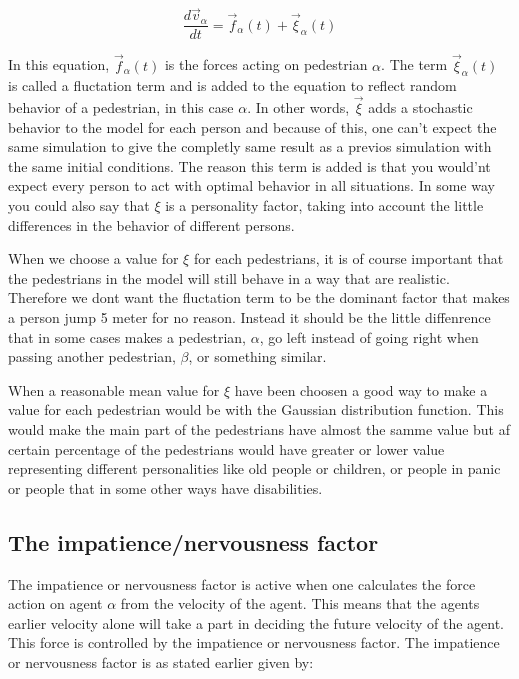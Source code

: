 \begin{equation}
\frac{d\vec{v}_{\alpha}}{dt}=\vec{f}_{\alpha}(t)+\vec{\xi}_{\alpha}(t)
\end{equation}

In this equation, $\vec{f}_{\alpha}(t)$ is the forces acting on pedestrian $\alpha$. The term $\vec{\xi}_{\alpha}(t)$
is called a fluctation term and is added to the equation to reflect random behavior of a pedestrian, in this case $\alpha$. In other words, $\vec{\xi}$ adds a stochastic behavior to the model for each person and because of this, one can't expect the same simulation to give the completly same result as a previos simulation with the same initial conditions. The reason this term is added is that you would'nt expect every person to act with optimal behavior in all situations. In some way you could also say that $\xi$ is a personality factor, taking into account the little differences in the behavior of different persons.

When we choose a value for $\xi$ for each pedestrians, it is of course important that the pedestrians in the model will still behave in a way that are realistic. Therefore we dont want the fluctation term to be the dominant factor that makes a person jump 5 meter for no reason. Instead it should be the little diffenrence that in some cases makes a pedestrian, $\alpha$, go left instead of going right when passing another pedestrian, $\beta$, or something similar.  

When a reasonable mean value for $\xi$ have been choosen a good way to make a value for each pedestrian would be with the Gaussian distribution function. This would make the main part of the pedestrians have almost the samme value but af certain percentage of the pedestrians would have greater or lower value representing different personalities like old people or children, or people in panic or people that in some other ways have disabilities. 


\subsection{The impatience/nervousness factor}
The impatience or nervousness factor is active when one calculates the force action 
on agent $\alpha$ from the velocity of the agent. This means that the agents earlier 
velocity alone will take a part in deciding the future velocity of the agent. This 
force is controlled by the impatience or nervousness factor. The impatience or 
nervousness factor is as stated earlier given by:

